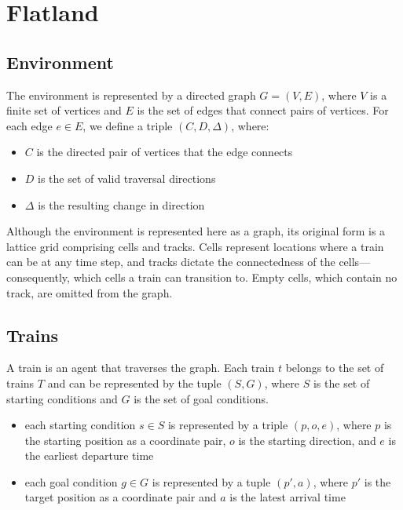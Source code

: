 


\section{Flatland}\label{sec:flatland}

\subsection{Environment}\label{sec:environment}
The environment is represented by a directed graph $G = (V,E)$, where $V$ is a finite set of vertices and $E$ is the set of edges that connect pairs of vertices.  For each edge $e \in E$, we define a triple $(C,D,\Delta)$, where:
\begin{itemize}
	\item $C$ is the directed pair of vertices that the edge connects
	\item $D$ is the set of valid traversal directions
	\item $\Delta$ is the resulting change in direction
\end{itemize}

\noindent Although the environment is represented here as a graph, its original form is a lattice grid comprising cells and tracks.  Cells represent locations where a train can be at any time step, and tracks dictate the connectedness of the cells---consequently, which cells a train can transition to.  Empty cells, which contain no track, are omitted from the graph.

\subsection{Trains}\label{sec:trains}
A train is an agent that traverses the graph.  Each train $t$ belongs to the set of trains $T$ and can be represented by the tuple $(S, G)$, where $S$ is the set of starting conditions and $G$ is the set of goal conditions.
\begin{itemize}
	\item each starting condition $s \in S$ is represented by a triple $(p,o,e)$, where $p$ is the starting position as a coordinate pair, $o$ is the starting direction, and $e$ is the earliest departure time
	\item each goal condition $g \in G$ is represented by a tuple $(p',a)$, where $p'$ is the target position as a coordinate pair and $a$ is the latest arrival time
\end{itemize}

